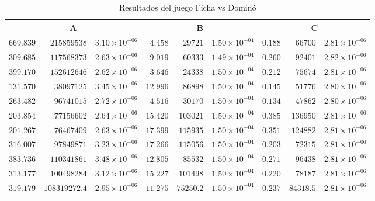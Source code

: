 \begin{table}[hbt!]
   \scriptsize
    \centering
    \begin{tabular}{r r r | r r r | r r r}
    \multicolumn{3}{c}{A} & \multicolumn{3}{c}{B} & \multicolumn{3}{c}{C} \\ \hline
	$669.839$ & $215859538$ & $3.10 {\times} 10^{-06}$ & $4.458$ & $29721$ & $1.50 {\times} 10^{-04}$ & $0.188$ & $66700$ & $2.81 {\times} 10^{-06}$ \\
	$309.685$ & $117568373$ & $2.63 {\times} 10^{-06}$ & $9.019$ & $60333$ & $1.49 {\times} 10^{-04}$ & $0.260$ & $92401$ & $2.82 {\times} 10^{-06}$ \\
	$399.170$ & $152612646$ & $2.62 {\times} 10^{-06}$ & $3.646$ & $24338$ & $1.50 {\times} 10^{-04}$ & $0.212$ & $75674$ & $2.81 {\times} 10^{-06}$ \\
	$131.570$ & $38097125$ & $3.45 {\times} 10^{-06}$ & $12.996$ & $86898$ & $1.50 {\times} 10^{-04}$ & $0.145$ & $51776$ & $2.80 {\times} 10^{-06}$ \\
	$263.482$ & $96741015$ & $2.72 {\times} 10^{-06}$ & $4.516$ & $30170$ & $1.50 {\times} 10^{-04}$ & $0.134$ & $47862$ & $2.80 {\times} 10^{-06}$ \\
	$203.854$ & $77156602$ & $2.64 {\times} 10^{-06}$ & $15.420$ & $103021$ & $1.50 {\times} 10^{-04}$ & $0.385$ & $136950$ & $2.81 {\times} 10^{-06}$ \\
	$201.267$ & $76467409$ & $2.63 {\times} 10^{-06}$ & $17.399$ & $115935$ & $1.50 {\times} 10^{-04}$ & $0.351$ & $124882$ & $2.81 {\times} 10^{-06}$ \\
	$316.007$ & $97849871$ & $3.23 {\times} 10^{-06}$ & $17.266$ & $115056$ & $1.50 {\times} 10^{-04}$ & $0.203$ & $72315$ & $2.81 {\times} 10^{-06}$ \\
	$383.736$ & $110341861$ & $3.48 {\times} 10^{-06}$ & $12.805$ & $85532$ & $1.50 {\times} 10^{-04}$ & $0.271$ & $96438$ & $2.81 {\times} 10^{-06}$ \\
	$313.177$ & $100498284$ & $3.12 {\times} 10^{-06}$ & $15.227$ & $101498$ & $1.50 {\times} 10^{-04}$ & $0.220$ & $78187$ & $2.81 {\times} 10^{-06}$ \\ \hline
	$319.179$ & $108319272.4$ & $2.95 {\times} 10^{-06}$ & $11.275$ & $75250.2$ & $1.50 {\times} 10^{-04}$ & $0.237$ & $84318.5$ & $2.81 {\times} 10^{-06}$ \\ \hline
    \end{tabular}
    \caption{Resultados del juego Ficha vs Dominó}
    \label{tab:resultados-domino}
\end{table}

